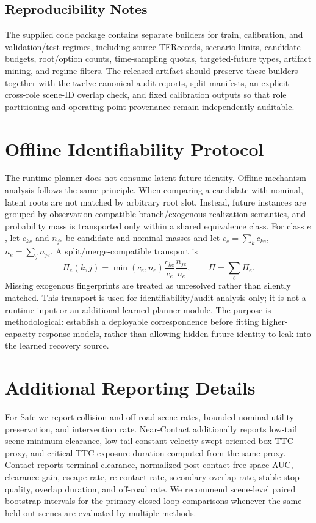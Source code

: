 \documentclass{article} %
\begin{document}
\subsection{Reproducibility Notes}
The supplied code package contains separate builders for train, calibration, and validation/test regimes, including source TFRecords, scenario limits, candidate budgets, root/option counts, time-sampling quotas, targeted-future types, artifact mining, and regime filters. The released artifact should preserve these builders together with the twelve canonical audit reports, split manifests, an explicit cross-role scene-ID overlap check, and fixed calibration outputs so that role partitioning and operating-point provenance remain independently auditable.

\section{Offline Identifiability Protocol}
\label{app:identifiability}

The runtime planner does not consume latent future identity. Offline mechanism analysis follows the same principle. When comparing a candidate with nominal, latent roots are not matched by arbitrary root slot. Instead, future instances are grouped by observation-compatible branch/exogenous realization semantics, and probability mass is transported only within a shared equivalence class. For class $e$, let $c_{ke}$ and $n_{je}$ be candidate and nominal masses and let $c_e=\sum_k c_{ke}$, $n_e=\sum_j n_{je}$. A split/merge-compatible transport is
\begin{equation}
 \Pi_e(k,j)=\min(c_e,n_e)\frac{c_{ke}}{c_e}\frac{n_{je}}{n_e},\qquad \Pi=\sum_e\Pi_e.
\end{equation}
Missing exogenous fingerprints are treated as unresolved rather than silently matched. This transport is used for identifiability/audit analysis only; it is not a runtime input or an additional learned planner module. The purpose is methodological: establish a deployable correspondence before fitting higher-capacity response models, rather than allowing hidden future identity to leak into the learned recovery source.

\section{Additional Reporting Details}
\label{app:metrics}

For Safe we report collision and off-road scene rates, bounded nominal-utility preservation, and intervention rate. Near-Contact additionally reports low-tail scene minimum clearance, low-tail constant-velocity swept oriented-box TTC proxy, and critical-TTC exposure duration computed from the same proxy. Contact reports terminal clearance, normalized post-contact free-space AUC, clearance gain, escape rate, re-contact rate, secondary-overlap rate, stable-stop quality, overlap duration, and off-road rate. We recommend scene-level paired bootstrap intervals for the primary closed-loop comparisons whenever the same held-out scenes are evaluated by multiple methods.
\end{document}
